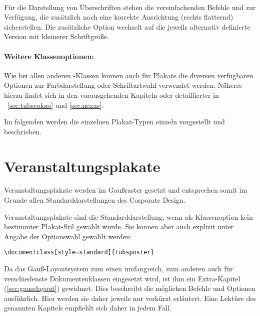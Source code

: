 \begin{Declaration}
  \\
\end{Declaration}

Für die Darstellung von Überschriften stehen die vereinfachenden
Befehle  und  zur Verfügung,
die zusätzlich noch eine korrekte Ausrichtung (rechts flatternd) sicherstellen.
Die zusätzliche Option  wechselt auf die jeweils alternativ
definierte Version mit kleinerer Schriftgröße.


\paragraph{Weitere Klassenoptionen:}

Wie bei allen anderen \tubslatex-Klassen können auch für Plakate
die diversen verfügbaren Optionen zur Farbdarstellung oder Schriftartwahl
verwendet werden.
Näheres hierzu findet sich in den vorausgehenden Kapiteln oder detaillierter
in \chaptername~\ref{sec:tubscolors} und \ref{sec:nexus}.
\bigskip

Im folgenden werden die einzelnen Plakat-Typen einzeln vorgestellt und beschrieben.

\clearpage
\section{Veranstaltungsplakate}

Veranstaltungsplakate werden im Gaußraster gesetzt und entsprechen somit
im Grunde allen Standarddarstellungen des Corporate Design.

Veranstaltungsplakate sind die Standarddarstellung, wenn als Klassenoption
kein bestimmter Plakat-Stil gewählt wurde. Sie können aber auch explizit
unter Angabe der Optionswahl  gewählt werden:
\begin{lstlisting}
\documentclass[style=standard]{tubsposter}
\end{lstlisting}

Da das Gauß-Layoutsystem zum einen umfangreich, zum anderen auch für
verschiedenste Dokumentenklassen eingesetzt wird,
ist ihm ein Extra-Kapitel (\ref{sec:gausslayout}) gewidmet.
Dies beschreibt die möglichen Befehle und Optionen ausführlich.
Hier werden sie daher jeweils nur verkürzt erläutert.
Eine Lektüre des genannten Kapitels empfiehlt sich daher in jedem Fall.


